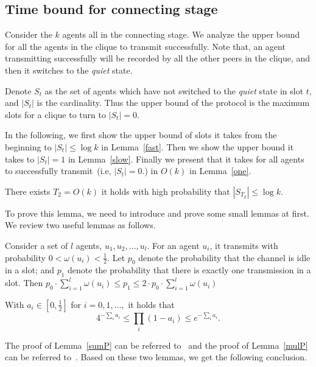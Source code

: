 \subsection{Time bound for connecting stage}
\label{boundPC}
Consider the $k$ agents all in the connecting stage.
We analyze the upper bound 
for all the agents in the clique to transmit successfully.
Note that, an agent transmitting successfully will be recorded by 
all the other peers in the clique, and then it switches to the \emph{quiet} state. 

Denote $S_t$ as the set of agents
which have not switched to the \emph{quiet} state in slot $t$, and 
$|S_t|$ is the cardinality. 
Thus the upper bound of the protocol is the maximum slots
for a clique to turn to $|S_t| = 0$.

In the following, we first show the
upper bound of slots it takes from the beginning to $|S_t| \leq \log k$ in Lemma~\ref{fast}.
Then we show the upper bound it takes to $|S_t| = 1$ in Lemma~\ref{slow}.
Finally we present that it takes for all agents to successfully transmit~(i.e, $|S_t| = 0$.) in $O(k)$ 
in Lemma~\ref{one}. 

\begin{lemma}
    \label{fast}
    There exists $T_2=O(k)$ it holds with high probability that $|S_{T_2}| \leq \log k$. 
\end{lemma}

To prove this lemma, we need to introduce and prove some small lemmas at first.
We review two useful lemmas as follows.
\begin{lemma}
    \label{sumP}
    Consider a set of $l$ agents, $u_1, u_2,\dots, u_l$.
    For an agent $u_i$, it transmits with probability 
    $0 < \omega(u_i) < \frac{1}{2}$. Let $p_0$ denote the 
    probability that the channel is idle in a slot; and $p_1$ denote 
    the probability that there is exactly one transmission in a slot.
    Then $p_0\cdot {\sum}_{i=1}^{l}\omega(u_i)\leq p_1 \leq
    2\cdot p_0\cdot {\sum}_{i=1}^{l}\omega(u_i)$     
\end{lemma}
\begin{lemma}
    \label{mulP}
    With $a_i \in [0, \frac{1}{2}]$ for $i = 0,1,\dots,$ it holds that
    \begin{equation}
        \label{mul}
        4^{-{\sum}_{i}a_i}\leq {\prod}_{i}(1-a_i)\leq e^{-{\sum}_{i}a_i}. 
    \end{equation}
\end{lemma}
The proof of Lemma~\ref{sumP} can be referred to~\cite{Richa2010A}
and the proof of Lemma~\ref{mulP} can be referred to~\cite{Daum2013Maximal}.
Based on these two lemmas, we get the following conclusion.

